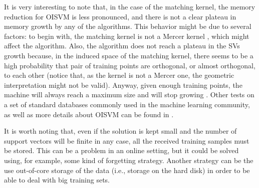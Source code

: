 It is very interesting to note that, in the case of the matching
kernel, the memory reduction for OISVM is less pronounced, and there
is not a clear plateau in memory growth by any of the algorithms.
This behavior might be due to several factors: to begin with, the
matching kernel is not a Mercer kernel \cite{fleuret:bmvc04}, which
might affect the algorithm. Also, the algorithm does not reach a
plateau in the SVs growth because, in the induced space of the
matching kernel, there seems to be a high probability that pair of
training points are orthogonal, or almost orthogonal, to each other
(notice that, as the kernel is not a Mercer one, the geometric
interpretation might not be valid). Anyway, given enough training
points, the machine will always reach a maximum size and will stop
growing \cite{engel2004}. Other tests on a set of standard databases commonly used in the
machine learning community, as well as more details about OISVM can be
found in \cite{Orabona07}.

It is worth noting that, even if the solution is kept small and the
number of support vectors will be finite in any case, 
all the received training samples must be stored. This can be a
problem in an online setting, but it could be solved using, for
example, some kind of forgetting strategy. Another strategy can be the
use out-of-core storage of the data (i.e., storage on the hard disk)
in order to be able to deal with big training sets.

